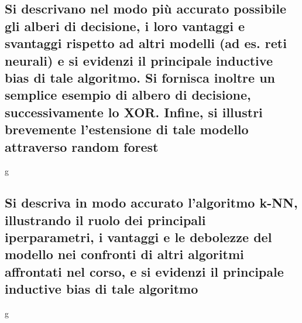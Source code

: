 \documentclass[10pt,oneside,a4paper]{article}
\begin{document}
	
	\subsection{Si descrivano nel modo più accurato possibile gli alberi di decisione, i loro vantaggi e svantaggi rispetto ad altri modelli (ad es. reti neurali)
		 e si evidenzi il principale inductive bias di tale algoritmo. Si fornisca inoltre un semplice esempio di albero di decisione, successivamente lo XOR. Infine, si illustri brevemente l’estensione di tale modello attraverso random forest}
	g
	
	
	\subsection{Si descriva in modo accurato l’algoritmo k-NN, illustrando il ruolo dei principali iperparametri, i vantaggi e le debolezze del modello nei 
		confronti di altri algoritmi affrontati nel corso, e si evidenzi il principale inductive bias di tale algoritmo}
	g
	
	
	
\end{document}

